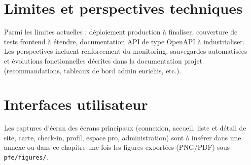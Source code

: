 \section{Limites et perspectives techniques}

Parmi les limites actuelles : déploiement production à finaliser, couverture de tests frontend à étendre, documentation API de type OpenAPI à industrialiser. Les perspectives incluent renforcement du monitoring, sauvegardes automatisées et évolutions fonctionnelles décrites dans la documentation projet (recommandations, tableaux de bord admin enrichis, etc.).

\section{Interfaces utilisateur}

Les captures d'écran des écrans principaux (connexion, accueil, liste et détail de site, carte, check-in, profil, espace pro, administration) sont à insérer dans une annexe ou dans ce chapitre une fois les figures exportées (PNG/PDF) sous \texttt{pfe/figures/}.
